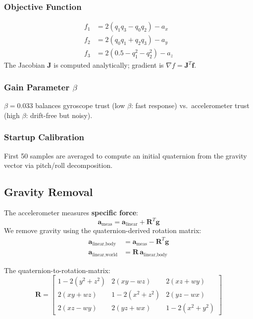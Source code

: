 \documentclass[12pt,a4paper]{article}
\begin{document}
\subsubsection{Objective Function}
\begin{align}
f_1 &= 2(q_1 q_3 - q_0 q_2) - a_x \\
f_2 &= 2(q_0 q_1 + q_2 q_3) - a_y \\
f_3 &= 2(0.5 - q_1^2 - q_2^2) - a_z
\end{align}
The Jacobian $\mathbf{J}$ is computed analytically; gradient is $\nabla f = \mathbf{J}^T \mathbf{f}$.

\subsubsection{Gain Parameter $\beta$}
$\beta = 0.033$ balances gyroscope trust (low $\beta$: fast response) vs.\ accelerometer trust (high $\beta$: drift-free but noisy).

\subsubsection{Startup Calibration}
First 50 samples are averaged to compute an initial quaternion from the gravity vector via pitch/roll decomposition.

\subsection{Gravity Removal}

The accelerometer measures \textbf{specific force}:
\begin{equation}
\mathbf{a}_{\text{meas}} = \mathbf{a}_{\text{linear}} + \mathbf{R}^T \mathbf{g}
\end{equation}
We remove gravity using the quaternion-derived rotation matrix:
\begin{align}
\mathbf{a}_{\text{linear,body}} &= \mathbf{a}_{\text{meas}} - \mathbf{R}^T \mathbf{g} \\
\mathbf{a}_{\text{linear,world}} &= \mathbf{R}\,\mathbf{a}_{\text{linear,body}}
\end{align}

The quaternion-to-rotation-matrix:
\begin{equation}
\mathbf{R} = \begin{bmatrix}
1-2(y^2+z^2) & 2(xy-wz) & 2(xz+wy) \\
2(xy+wz) & 1-2(x^2+z^2) & 2(yz-wx) \\
2(xz-wy) & 2(yz+wx) & 1-2(x^2+y^2)
\end{bmatrix}
\end{equation}
\end{document}
